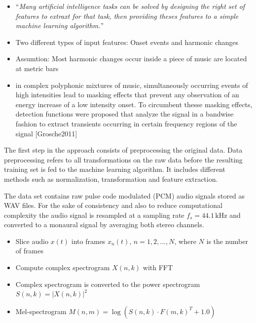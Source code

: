 \documentclass{article}
\begin{document}
\begin{itemize}
\item ``\emph{Many artificial intelligence tasks can be solved by designing the right set of features to extraxt for that task, then providing theses features to a simple machine learning algorithm.}'' \cite[Goodfellow2016]{Goodfellow2016}
\item Two different types of input features: Onset events and harmonic changes
\item Assumtion: Most harmonic changes occur inside a piece of music are located at metric bars \cite[Khadkevich2012]{Khadkevich2012}
\item in complex polyphonic mixtures of music, simultaneously occurring events of high intensities lead to masking effects that prevent any observation of an energy increase of a low intensity onset. To circumbent thesse masking effects, detection functions were proposed that analyze the signal in a bandwise fashion to extract transients occurring in certain frequency regions of the signal [Grosche2011]
\end{itemize}



The first step in the approach consists of preprocessing the original data. Data preprocessing refers to all transformations on the raw data before the resulting training set is fed to the machine learning algorithm. It includes different methods such as normalization, transformation and feature extraction. 

The data set contains raw pulse code modulated (PCM) audio signals stored as WAV files. For the sake of consistency and also to reduce computational complexity the audio signal is resampled at a sampling rate $f_s = 44.1 \,\text{kHz}$ and converted to a monaural signal by averaging both stereo channels. 


\begin{itemize}
\item Slice audio $x(t)$ into frames $x_n(t)$, $n = 1, 2,\dots, N$, where $N$ is the number of frames
\item Compute complex spectrogram $X(n,k)$ with FFT 
\item Complex spectrogram is converted to the power spectrogram $S(n, k) = |X(n, k)|^2$
\item Mel-spectrogram $M(n,m) = \log \left( S(n,k) \cdot F(m,k)^T + 1.0 \right)$
\end{itemize}
\vspace{1em}
\end{document}
